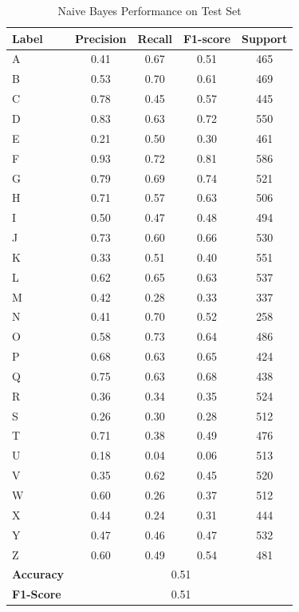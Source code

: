\begin{table}[H]
\centering
\small
\renewcommand{\arraystretch}{1.2}
\setlength{\tabcolsep}{10pt}
\caption{Naive Bayes Performance on Test Set}
\begin{tabular}{|p{2cm}|cccc|}
\hline
\textbf{Label}& \textbf{Precision} & \textbf{Recall} & \textbf{F1-score} & \textbf{Support} \\
\hline
A & 0.41 & 0.67 & 0.51 & 465 \\
B & 0.53 & 0.70 & 0.61 & 469 \\
C & 0.78 & 0.45 & 0.57 & 445 \\
D & 0.83 & 0.63 & 0.72 & 550 \\
E & 0.21 & 0.50 & 0.30 & 461 \\
F & 0.93 & 0.72 & 0.81 & 586 \\
G & 0.79 & 0.69 & 0.74 & 521 \\
H & 0.71 & 0.57 & 0.63 & 506 \\
I & 0.50 & 0.47 & 0.48 & 494 \\
J & 0.73 & 0.60 & 0.66 & 530 \\
K & 0.33 & 0.51 & 0.40 & 551 \\
L & 0.62 & 0.65 & 0.63 & 537 \\
M & 0.42 & 0.28 & 0.33 & 337 \\
N & 0.41 & 0.70 & 0.52 & 258 \\
O & 0.58 & 0.73 & 0.64 & 486 \\
P & 0.68 & 0.63 & 0.65 & 424 \\
Q & 0.75 & 0.63 & 0.68 & 438 \\
R & 0.36 & 0.34 & 0.35 & 524 \\
S & 0.26 & 0.30 & 0.28 & 512 \\
T & 0.71 & 0.38 & 0.49 & 476 \\
U & 0.18 & 0.04 & 0.06 & 513 \\
V & 0.35 & 0.62 & 0.45 & 520 \\
W & 0.60 & 0.26 & 0.37 & 512 \\
X & 0.44 & 0.24 & 0.31 & 444 \\
Y & 0.47 & 0.46 & 0.47 & 532 \\
Z & 0.60 & 0.49 & 0.54 & 481 \\
\hline
\textbf{Accuracy} & \multicolumn{4}{|c|}{0.51} \\
\textbf{F1-Score} & \multicolumn{4}{|c|}{0.51}  \\
\hline
\end{tabular}
\end{table}


